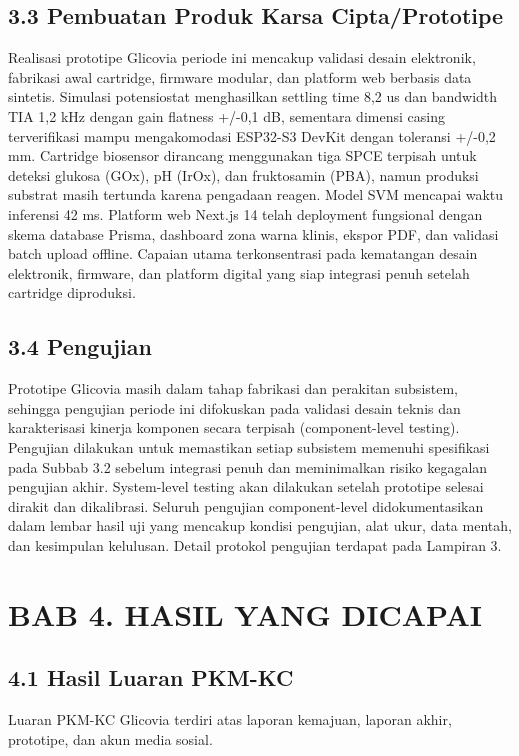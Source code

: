 \documentclass[12pt,a4paper]{article}
\begin{document}
\subsection*{3.3 Pembuatan Produk Karsa Cipta/Prototipe}
Realisasi prototipe Glicovia periode ini mencakup validasi desain elektronik, fabrikasi awal cartridge, firmware modular, dan platform web berbasis data sintetis. Simulasi potensiostat menghasilkan settling time 8,2 us dan bandwidth TIA 1,2 kHz dengan gain flatness +/-0,1 dB, sementara dimensi casing terverifikasi mampu mengakomodasi ESP32-S3 DevKit dengan toleransi +/-0,2 mm. Cartridge biosensor dirancang menggunakan tiga SPCE terpisah untuk deteksi glukosa (GOx), pH (IrOx), dan fruktosamin (PBA), namun produksi substrat masih tertunda karena pengadaan reagen. Model SVM mencapai waktu inferensi 42 ms. Platform web Next.js 14 telah deployment fungsional dengan skema database Prisma, dashboard zona warna klinis, ekspor PDF, dan validasi batch upload offline. Capaian utama terkonsentrasi pada kematangan desain elektronik, firmware, dan platform digital yang siap integrasi penuh setelah cartridge diproduksi.

\subsection*{3.4 Pengujian}
Prototipe Glicovia masih dalam tahap fabrikasi dan perakitan subsistem, sehingga pengujian periode ini difokuskan pada validasi desain teknis dan karakterisasi kinerja komponen secara terpisah (component-level testing). Pengujian dilakukan untuk memastikan setiap subsistem memenuhi spesifikasi pada Subbab 3.2 sebelum integrasi penuh dan meminimalkan risiko kegagalan pengujian akhir. System-level testing akan dilakukan setelah prototipe selesai dirakit dan dikalibrasi. Seluruh pengujian component-level didokumentasikan dalam lembar hasil uji yang mencakup kondisi pengujian, alat ukur, data mentah, dan kesimpulan kelulusan. Detail protokol pengujian terdapat pada Lampiran 3.

\section*{BAB 4. HASIL YANG DICAPAI}

\subsection*{4.1 Hasil Luaran PKM-KC}
Luaran PKM-KC Glicovia terdiri atas laporan kemajuan, laporan akhir, prototipe, dan akun media sosial.
\end{document}
